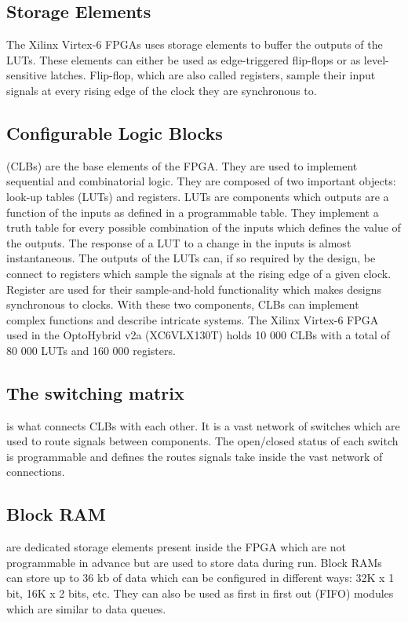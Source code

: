     \subsection{Storage Elements}

      The Xilinx Virtex-6 FPGAs uses storage elements to buffer the outputs of the LUTs. These elements can either be used as edge-triggered flip-flops or as level-sensitive latches. Flip-flop, which are also called registers, sample their input signals at every rising edge of the clock they are synchronous to.  

    \subsection{Configurable Logic Blocks} (CLBs) are the base elements of the FPGA. They are used to implement sequential and combinatorial logic. They are composed of two important objects: look-up tables (LUTs) and registers. LUTs are components which outputs are a function of the inputs as defined in a programmable table. They implement a truth table for every possible combination of the inputs which defines the value of the outputs. The response of a LUT to a change in the inputs is almost instantaneous. The outputs of the LUTs can, if so required by the design, be connect to registers which sample the signals at the rising edge of a given clock. Register are used for their sample-and-hold functionality which makes designs synchronous to clocks. With these two components, CLBs can implement complex functions and describe intricate systems. The Xilinx Virtex-6 FPGA used in the OptoHybrid v2a (XC6VLX130T) holds 10 000 CLBs with a total of 80 000 LUTs and 160 000 registers.

    \subsection{The switching matrix} is what connects CLBs with each other. It is a vast network of switches which are used to route signals between components. The open/closed status of each switch is programmable and defines the routes signals take inside the vast network of connections.

    \subsection{Block RAM} are dedicated storage elements present inside the FPGA which are not programmable in advance but are used to store data during run. Block RAMs can store up to 36 kb of data which can be configured in different ways: 32K x 1 bit, 16K x 2 bits, etc. They can also be used as first in first out (FIFO) modules which are similar to data queues.

